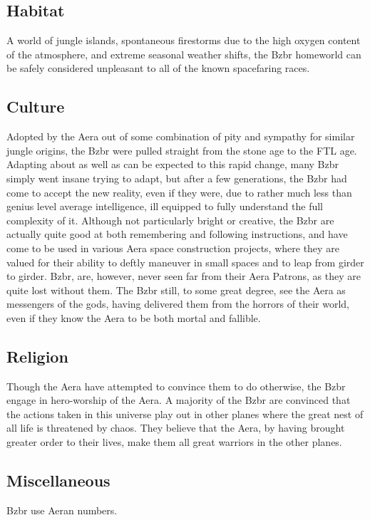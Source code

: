 \subsection{Habitat}
A world of jungle islands, spontaneous firestorms due to the high
oxygen content of the atmosphere, and extreme seasonal weather shifts,
the Bzbr homeworld can be safely considered unpleasant to all of the
known spacefaring races.

\subsection{Culture}
Adopted by the Aera out of some combination of pity and sympathy for
similar jungle origins, the Bzbr were pulled straight from the stone
age to the FTL age. Adapting about as well as can be expected to this
rapid change, many Bzbr simply went insane trying to adapt, but after
a few generations, the Bzbr had come to accept the new reality, even
if they were, due to rather much less than genius level average
intelligence, ill equipped to fully understand the full complexity of
it. Although not particularly bright or creative, the Bzbr are
actually quite good at both remembering and following instructions,
and have come to be used in various Aera space construction projects,
where they are valued for their ability to deftly maneuver in small
spaces and to leap from girder to girder. Bzbr, are, however, never
seen far from their Aera Patrons, as they are quite lost without
them. The Bzbr still, to some great degree, see the Aera as messengers
of the gods, having delivered them from the horrors of their world,
even if they know the Aera to be both mortal and fallible.

\subsection{Religion}
Though the Aera have attempted to convince them to do otherwise, the
Bzbr engage in hero-worship of the Aera. A majority of the Bzbr are
convinced that the actions taken in this universe play out in other
planes where the great nest of all life is threatened by chaos. They
believe that the Aera, by having brought greater order to their lives,
make them all great warriors in the other planes.

\subsection{Miscellaneous}
Bzbr use Aeran numbers. 


